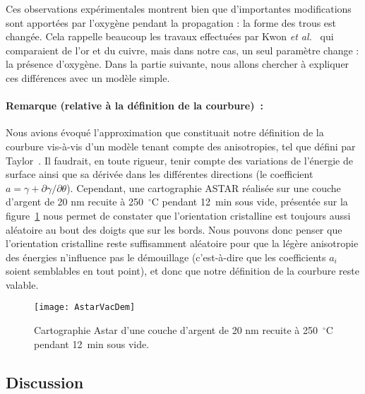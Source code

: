 {{Ces observations expérimentales montrent bien que d’importantes modifications sont apportées par l’oxygène pendant la propagation : la forme des trous est changée. Cela rappelle beaucoup les travaux effectuées par Kwon\textit{ et al.}~\cite{kwon2003comparison} qui comparaient de l’or et du cuivre, mais dans notre cas, un seul paramètre change : la présence d’oxygène. Dans la partie suivante, nous allons chercher à expliquer ces différences avec un modèle simple.\par 

\paragraph*{Remarque (relative à la définition de la courbure)~:}
Nous avions évoqué l’approximation que constituait notre définition de la courbure vis-à-vis d’un modèle tenant compte des anisotropies, tel que défini par Taylor~\cite{taylor1992ii}. Il faudrait, en toute rigueur, tenir compte des variations de l’énergie de surface ainsi que sa dérivée dans les différentes directions (le coefficient $a=\gamma+\partial\gamma/\partial\theta$). Cependant, une cartographie ASTAR réalisée sur une couche d’argent de 20 nm recuite à 250~$^\circ$C pendant 12~min sous vide, présentée sur la figure~\ref{astarVacDem} nous permet de constater que l’orientation cristalline est toujours aussi aléatoire au bout des doigts que sur les bords. Nous pouvons donc penser que l’orientation cristalline reste suffisamment aléatoire pour que la légère anisotropie des énergies n’influence pas le démouillage (c'est-à-dire que les coefficients $a_i$ soient semblables en tout point), et donc que notre définition de la courbure reste valable.\par 

\begin{figure}[!htb]
\centering
\texttt{[image: AstarVacDem]}
\caption{Cartographie Astar d’une couche d’argent de 20 nm recuite à 250~$^\circ$C pendant 12~min sous vide.}
\label{astarVacDem}
\end{figure}

		\subsection{Discussion}

}}
